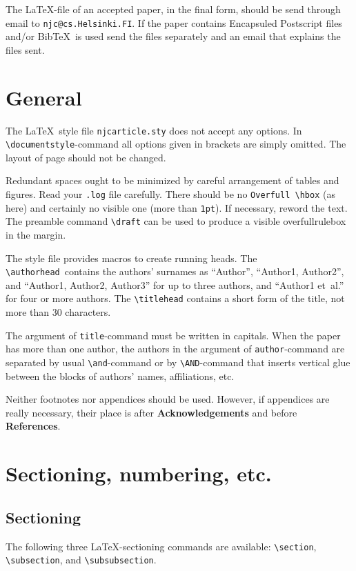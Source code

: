 The \LaTeX-file of an accepted paper, in the final form, should
be send through email to \verb|njc@cs.Helsinki.FI|.
If the paper contains Encapsuled Postscript files
and/or Bib\TeX\ is used send the files separately and an email
that explains the files sent.

\section{General}

The \LaTeX\ style file {\tt njcarticle.sty} does not accept
any options.
In \verb|\documentstyle|-command all options given in brackets
are simply omitted.
The layout of page should not be changed.

Redundant spaces ought to be minimized
by careful arrangement of tables and figures.
Read your {\tt .log} file carefully.
There should be no \verb!Overfull \hbox! (as here)
and certainly no visible one (more than {\tt 1pt}).
If necessary, reword the text.
The preamble command \verb|\draft| can be used to produce
a visible overfullrulebox in the margin.

The style file provides macros to create running heads.
The \verb!\authorhead!\ contains the authors' surnames as ``Author'',
``Author1, Author2'', and
``Author1, Author2, Author3'' for up to three authors,
and ``Author1 et~al.'' for four or more authors.
The \verb!\titlehead!
contains a short form of the title, not more than 30 characters.

The argument of \verb|title|-command must be written in capitals.
When the paper has more than one author, the authors in the argument of
\verb|author|-command are separated by usual \verb|\and|-command or 
by \verb|\AND|-command that inserts vertical glue between the blocks
of authors'  names, affiliations, etc.

Neither footnotes nor appendices should be used.
However, if appendices are really necessary, their place
is after {\bf Acknowledgements} and before {\bf References}.

\section{Sectioning, numbering, etc.}

\subsection{Sectioning}

The following three \LaTeX-sectioning commands are available:
\verb|\section|, \verb|\subsection|, and \verb|\subsubsection|.

